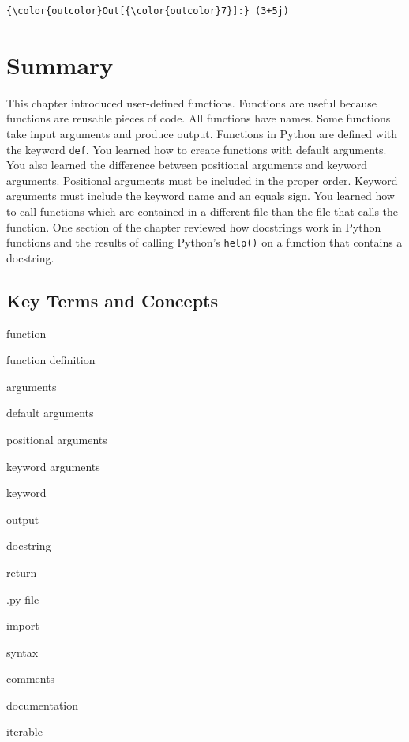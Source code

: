\documentclass{book}
\newenvironment{key_terms}{\begin{multicols}{3}}{\end{multicols}} %
\begin{document}
\begin{Verbatim}[commandchars=\\\{\}]
{\color{outcolor}Out[{\color{outcolor}7}]:} (3+5j)
\end{Verbatim}
            

    
        \newpage
        \section{Summary}\label{summary}

    




    
        This chapter introduced user-defined functions. Functions are useful
because functions are reusable pieces of code. All functions have names.
Some functions take input arguments and produce output. Functions in
Python are defined with the keyword \lstinline!def!. You learned how to
create functions with default arguments. You also learned the difference
between positional arguments and keyword arguments. Positional arguments
must be included in the proper order. Keyword arguments must include the
keyword name and an equals sign. You learned how to call functions which
are contained in a different file than the file that calls the function.
One section of the chapter reviewed how docstrings work in Python
functions and the results of calling Python's \lstinline!help()! on a
function that contains a docstring.
    




    
        \subsection{Key Terms and Concepts}\label{key-terms-and-concepts}
    




    
        \begin{key_terms}
        function

function definition

arguments

default arguments

positional arguments

keyword arguments

keyword

output

docstring

return

.py-file

import

syntax

comments

documentation

iterable
        \end{key_terms}
\end{document}
